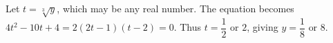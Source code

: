 Let $t=\sqrt[3]y$, which may be any real number. The equation becomes $4t^2-10t+4=2(2t-1)(t-2)=0$. Thus $t=\dfrac{1}{2}$ or $2$, giving $\boxed{y=\dfrac{1}{8}\text{ or }8}$.
